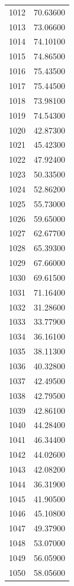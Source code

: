 \documentclass[
  letterpaper,
  DIV=11,
  numbers=noendperiod]{scrreprt}
\begin{document}
\begin{tcolorbox}
\begin{tabular}{lr}
1012 &         70.63600 \\
1013 &         73.06600 \\
1014 &         74.10100 \\
1015 &         74.86500 \\
1016 &         75.43500 \\
1017 &         75.44500 \\
1018 &         73.98100 \\
1019 &         74.54300 \\
1020 &         42.87300 \\
1021 &         45.42300 \\
1022 &         47.92400 \\
1023 &         50.33500 \\
1024 &         52.86200 \\
1025 &         55.73000 \\
1026 &         59.65000 \\
1027 &         62.67700 \\
1028 &         65.39300 \\
1029 &         67.66000 \\
1030 &         69.61500 \\
1031 &         71.16400 \\
1032 &         31.28600 \\
1033 &         33.77900 \\
1034 &         36.16100 \\
1035 &         38.11300 \\
1036 &         40.32800 \\
1037 &         42.49500 \\
1038 &         42.79500 \\
1039 &         42.86100 \\
1040 &         44.28400 \\
1041 &         46.34400 \\
1042 &         44.02600 \\
1043 &         42.08200 \\
1044 &         36.31900 \\
1045 &         41.90500 \\
1046 &         45.10800 \\
1047 &         49.37900 \\
1048 &         53.07000 \\
1049 &         56.05900 \\
1050 &         58.05600 \\

\end{tabular}
\end{tcolorbox}
\end{document}
